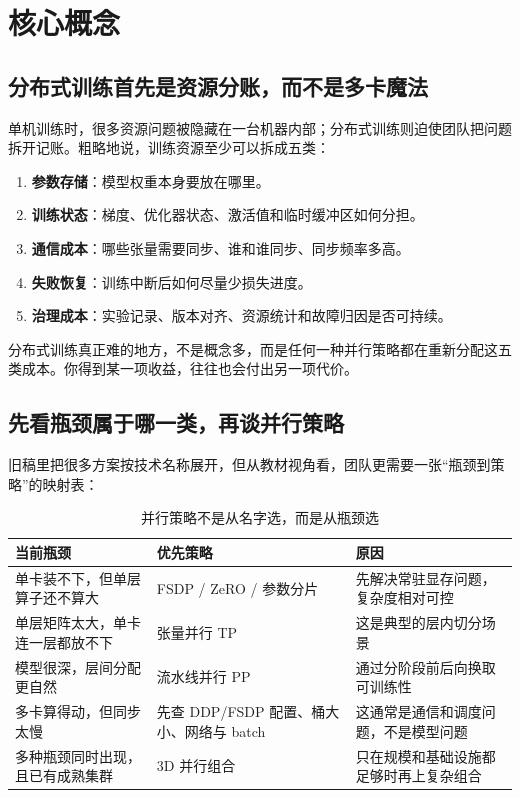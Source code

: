 \section{核心概念}
\subsection{分布式训练首先是资源分账，而不是多卡魔法}
单机训练时，很多资源问题被隐藏在一台机器内部；分布式训练则迫使团队把问题拆开记账。粗略地说，训练资源至少可以拆成五类：
\begin{enumerate}
  \item \textbf{参数存储}：模型权重本身要放在哪里。
  \item \textbf{训练状态}：梯度、优化器状态、激活值和临时缓冲区如何分担。
  \item \textbf{通信成本}：哪些张量需要同步、谁和谁同步、同步频率多高。
  \item \textbf{失败恢复}：训练中断后如何尽量少损失进度。
  \item \textbf{治理成本}：实验记录、版本对齐、资源统计和故障归因是否可持续。
\end{enumerate}

分布式训练真正难的地方，不是概念多，而是任何一种并行策略都在重新分配这五类成本。你得到某一项收益，往往也会付出另一项代价。

\subsection{先看瓶颈属于哪一类，再谈并行策略}
旧稿里把很多方案按技术名称展开，但从教材视角看，团队更需要一张“瓶颈到策略”的映射表：
\begin{table}[H]
\centering
\small
\begin{tabularx}{\textwidth}{>{\raggedright\arraybackslash}p{3cm}>{\raggedright\arraybackslash}p{3.2cm}>{\raggedright\arraybackslash}X}
\toprule
\textbf{当前瓶颈} & \textbf{优先策略} & \textbf{原因} \\
\midrule
单卡装不下，但单层算子还不算大 & FSDP / ZeRO / 参数分片 & 先解决常驻显存问题，复杂度相对可控 \\
单层矩阵太大，单卡连一层都放不下 & 张量并行 TP & 这是典型的层内切分场景 \\
模型很深，层间分配更自然 & 流水线并行 PP & 通过分阶段前后向换取可训练性 \\
多卡算得动，但同步太慢 & 先查 DDP/FSDP 配置、桶大小、网络与 batch & 这通常是通信和调度问题，不是模型问题 \\
多种瓶颈同时出现，且已有成熟集群 & 3D 并行组合 & 只在规模和基础设施都足够时再上复杂组合 \\
\bottomrule
\end{tabularx}
\caption{并行策略不是从名字选，而是从瓶颈选}
\label{tab:distributed-bottleneck-routing}
\end{table}

